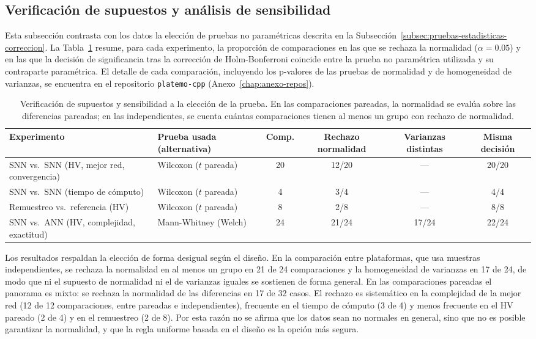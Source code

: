 \subsection{Verificación de supuestos y análisis de sensibilidad}
\label{sec:verificacion-supuestos}

Esta subsección contrasta con los datos la elección de pruebas no paramétricas descrita en la Subsección~\ref{subsec:pruebas-estadisticas-correccion}. La Tabla~\ref{tab:supuestos-resumen} resume, para cada experimento, la proporción de comparaciones en las que se rechaza la normalidad ($\alpha=0.05$) y en las que la decisión de significancia tras la corrección de Holm-Bonferroni coincide entre la prueba no paramétrica utilizada y su contraparte paramétrica. El detalle de cada comparación, incluyendo los p-valores de las pruebas de normalidad y de homogeneidad de varianzas, se encuentra en el repositorio \texttt{platemo-cpp} (Anexo~\ref{chap:anexo-repos}).

\begin{table}[htbp]
\centering
\small
\caption{Verificación de supuestos y sensibilidad a la elección de la prueba. En las comparaciones pareadas, la normalidad se evalúa sobre las diferencias pareadas; en las independientes, se cuenta cuántas comparaciones tienen al menos un grupo con rechazo de normalidad.}
\label{tab:supuestos-resumen}
\begin{tabular}{p{4.2cm}p{2.9cm}cccc}
\toprule
\textbf{Experimento} & \textbf{Prueba usada (alternativa)} & \textbf{Comp.} & \textbf{Rechazo normalidad} & \textbf{Varianzas distintas} & \textbf{Misma decisión} \\
\midrule
SNN vs.\ SNN (HV, mejor red, convergencia) & Wilcoxon ($t$ pareada) & 20 & 12/20 & --- & 20/20 \\
SNN vs.\ SNN (tiempo de cómputo) & Wilcoxon ($t$ pareada) & 4 & 3/4 & --- & 4/4 \\
Remuestreo vs.\ referencia (HV) & Wilcoxon ($t$ pareada) & 8 & 2/8 & --- & 8/8 \\
SNN vs.\ ANN (HV, complejidad, exactitud) & Mann-Whitney (Welch) & 24 & 21/24 & 17/24 & 22/24 \\
\bottomrule
\end{tabular}
\end{table}

Los resultados respaldan la elección de forma desigual según el diseño. En la comparación entre plataformas, que usa muestras independientes, se rechaza la normalidad en al menos un grupo en 21 de 24 comparaciones y la homogeneidad de varianzas en 17 de 24, de modo que ni el supuesto de normalidad ni el de varianzas iguales se sostienen de forma general. En las comparaciones pareadas el panorama es mixto: se rechaza la normalidad de las diferencias en 17 de 32 casos. El rechazo es sistemático en la complejidad de la mejor red (12 de 12 comparaciones, entre pareadas e independientes), frecuente en el tiempo de cómputo (3 de 4) y menos frecuente en el HV pareado (2 de 4) y en el remuestreo (2 de 8). Por esta razón no se afirma que los datos sean no normales en general, sino que no es posible garantizar la normalidad, y que la regla uniforme basada en el diseño es la opción más segura.

